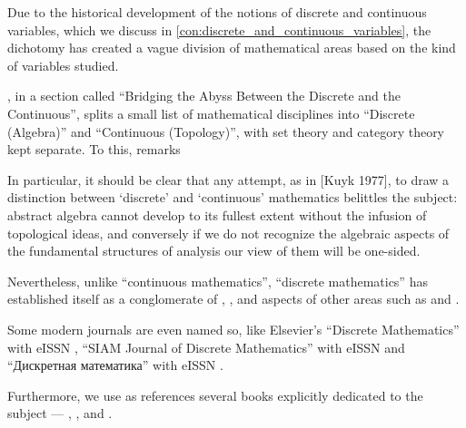 \begin{remark}\label{rem:discrete_mathematics}
  Due to the historical development of the notions of discrete and continuous variables, which we discuss in \cref{con:discrete_and_continuous_variables}, the dichotomy has created a vague division of mathematical areas based on the kind of variables studied.

  , in a section called \enquote{Bridging the Abyss Between the Discrete and the Continuous}, splits a small list of mathematical disciplines into \enquote{Discrete (Algebra)} and \enquote{Continuous (Topology)}, with set theory and category theory kept separate. To this,  remarks
  \begin{displayquote}
    In particular, it should be clear that any attempt, as in [Kuyk 1977], to draw a distinction between \enquote*{discrete} and \enquote*{continuous} mathematics belittles the subject: abstract algebra cannot develop to its fullest extent without the infusion of topological ideas, and conversely if we do not recognize the algebraic aspects of the fundamental structures of analysis our view of them will be one-sided.
  \end{displayquote}

  Nevertheless, unlike \enquote{continuous mathematics}, \enquote{discrete mathematics} has established itself as a conglomerate of , ,  and aspects of other areas such as  and .

  Some modern journals are even named so, like Elsevier's \enquote{Discrete Mathematics} with eISSN , \enquote{SIAM Journal of Discrete Mathematics} with eISSN  and \enquote{Дискретная математика} with eISSN .

  Furthermore, we use as references several books explicitly dedicated to the subject --- \cite{Rosen2019DiscreteMathematics}, \cite{БелоусовТкачёв2004ДискретнаяМатематика}, \cite{Новиков2013ДискретнаяМатематика} and \cite{Яблонский2003ДискретнаяМатематика}.
\end{remark}

